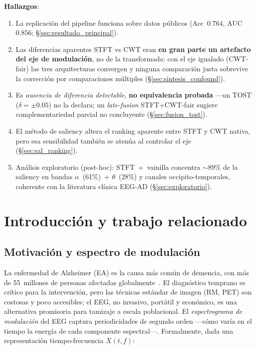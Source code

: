 \documentclass[11pt, a4paper]{article}
\begin{document}
\noindent\textbf{Hallazgos}:
\begin{enumerate}[leftmargin=*, topsep=2pt]
    \item La replicación del pipeline funciona sobre datos públicos
    (Acc~$0.764$, AUC~$0.856$; §\ref{sec:resultado_principal}).
    \item Las diferencias aparentes STFT vs CWT eran \textbf{en gran parte
    un artefacto del eje de modulación}, no de la transformada: con el eje
    igualado (CWT-fair) las tres arquitecturas convergen y ninguna
    comparación justa sobrevive la corrección por comparaciones múltiples
    (§\ref{sec:sintesis_confound}).
    \item Es \emph{ausencia de diferencia detectable}, \textbf{no
    equivalencia probada} ---un TOST ($\delta=\pm0.05$) no la declara; un
    \emph{late-fusion} STFT+CWT-fair sugiere complementariedad parcial no
    concluyente (§\ref{sec:fusion_tost}).
    \item El método de saliency altera el ranking aparente entre STFT y CWT
    nativa, pero esa sensibilidad también se atenúa al controlar el eje
    (§\ref{sec:sal_ranking}).
    \item Análisis exploratorio (post-hoc): STFT~+~vainilla concentra
    $\sim$89\% de la saliency en bandas $\alpha$~(61\%)~+ $\theta$~(28\%) y
    canales occipito-temporales, coherente con la literatura clínica
    EEG-AD (§\ref{sec:exploratorio}).
\end{enumerate}

\section{Introducción y trabajo relacionado}

\subsection{Motivación y espectro de modulación}

La enfermedad de Alzheimer (EA) es la causa más común de demencia, con más
de 55~millones de personas afectadas globalmente~\cite{WHO2023}. El
diagnóstico temprano es crítico para la intervención, pero las técnicas
estándar de imagen (RM, PET) son costosas y poco accesibles; el EEG, no
invasivo, portátil y económico, es una alternativa promisoria para tamizaje
a escala poblacional. El \emph{espectrograma de modulación} del EEG captura
periodicidades de segundo orden ---cómo varía en el tiempo la energía de
cada componente espectral---. Formalmente, dada una representación
tiempo-frecuencia $X(t,f)$:
\end{document}
